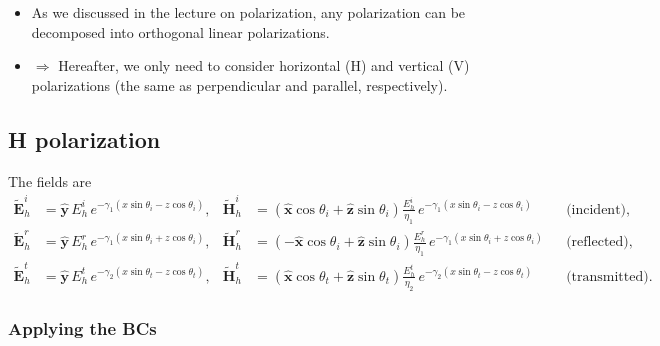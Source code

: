 \documentclass[11pt, oneside]{article}
\begin{document}
\begin{itemize}
	\item As we discussed in the lecture on polarization, any polarization can be decomposed into orthogonal linear polarizations.
	\item[] $\Rightarrow$ Hereafter, we only need to consider horizontal (H) and vertical (V) polarizations (the same as perpendicular and parallel, respectively).
\end{itemize}

\subsection{H polarization}

The fields are
\begin{align}
	\tilde{\mathbf{E}}_h^i &= \hat{\mathbf{y}}\,E_h^i\,e^{-\gamma_1(x\sin\theta_i - z\cos\theta_i)}, &
	\tilde{\mathbf{H}}_h^i &= \left(\hat{\mathbf{x}}\cos\theta_i + \hat{\mathbf{z}}\sin\theta_i\right)\frac{E_h^i}{\eta_1}\,e^{-\gamma_1(x\sin\theta_i - z\cos\theta_i)} && \text{(incident)}, \label{e:h_i}\\
	\tilde{\mathbf{E}}_h^r &= \hat{\mathbf{y}}\,E_h^r\,e^{-\gamma_1(x\sin\theta_i + z\cos\theta_i)}, &
	\tilde{\mathbf{H}}_h^r &= \left(-\hat{\mathbf{x}}\cos\theta_i + \hat{\mathbf{z}}\sin\theta_i\right)\frac{E_h^r}{\eta_1}\,e^{-\gamma_1(x\sin\theta_i + z\cos\theta_i)} && \text{(reflected)}, \label{e:h_r}\\
	\tilde{\mathbf{E}}_h^t &= \hat{\mathbf{y}}\,E_h^t\,e^{-\gamma_2(x\sin\theta_t - z\cos\theta_t)}, &
	\tilde{\mathbf{H}}_h^t &= \left(\hat{\mathbf{x}}\cos\theta_t + \hat{\mathbf{z}}\sin\theta_t\right)\frac{E_h^t}{\eta_2}\,e^{-\gamma_2(x\sin\theta_t - z\cos\theta_t)} && \text{(transmitted)}. \label{e:h_t}
\end{align}

\subsubsection{Applying the BCs}
\end{document}
